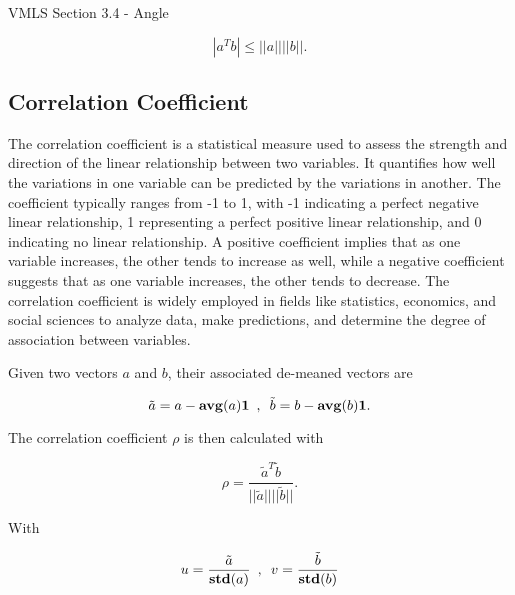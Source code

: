 \begin{notes}{VMLS Section 3.4 - Angle}
\begin{highlight}
        \begin{equation*}
            |a^{T}b| \leq ||a|| ||b||.
        \end{equation*}
    \end{highlight}

    \subsection*{Correlation Coefficient}

    The correlation coefficient is a statistical measure used to assess the strength and direction of the linear relationship between two variables. It quantifies how well the variations in one variable can be predicted by the 
    variations in another. The coefficient typically ranges from -1 to 1, with -1 indicating a perfect negative linear relationship, 1 representing a perfect positive linear relationship, and 0 indicating no linear relationship. 
    A positive coefficient implies that as one variable increases, the other tends to increase as well, while a negative coefficient suggests that as one variable increases, the other tends to decrease. The correlation coefficient 
    is widely employed in fields like statistics, economics, and social sciences to analyze data, make predictions, and determine the degree of association between variables.

    \begin{highlight}
        Given two vectors $a$ and $b$, their associated de-meaned vectors are

        \begin{equation*}
            \tilde{a} = a - \mathbf{avg}(a)\mathbf{1} \hspace*{5pt} , \hspace*{5pt} \tilde{b} = b - \mathbf{avg}(b)\mathbf{1}.
        \end{equation*}

        The correlation coefficient $\rho$ is then calculated with 

        \begin{equation*}
            \rho = \frac{\tilde{a}^{T}\tilde{b}}{||\tilde{a}|| ||\tilde{b}||}.
        \end{equation*}

        With 

        \begin{equation*}
            u = \frac{\tilde{a}}{\mathbf{std}(a)} \hspace*{5pt} , \hspace*{5pt} v = \frac{\tilde{b}}{\mathbf{std}(b)}
        \end{equation*}


\end{highlight}
\end{notes}
